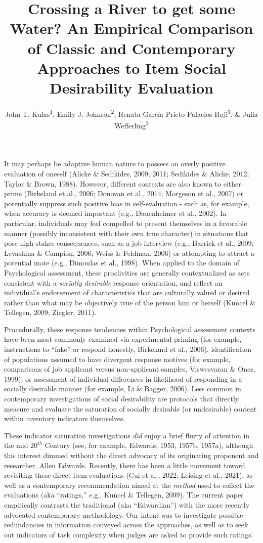 \documentclass[
  ,jou]{apa6}
\title{Crossing a River to get some Water? An Empirical Comparison of Classic and Contemporary Approaches to Item Social Desirability Evaluation}
\author{John T. Kulas\textsuperscript{1}, Emily J. Johnson\textsuperscript{2}, Renata García Prieto Palacios Roji\textsuperscript{3}, \& Julia Wefferling\textsuperscript{3}}
\date{}
\affiliation{\vspace{0.5cm}\textsuperscript{1} eRg\\\textsuperscript{2} St.~Cloud State University\\\textsuperscript{3} Montclair State University}
\begin{document}
\maketitle

It may perhaps be adaptive human nature to possess an overly positive evaluation of oneself (Alicke \& Sedikides, 2009, 2011; Sedikides \& Alicke, 2012; Taylor \& Brown, 1988). However, different contexts are also known to either prime (Birkeland et al., 2006; Donovan et al., 2014; Morgeson et al., 2007) or potentially suppress such positive bias in self-evaluation - such as, for example, when accuracy is deemed important (e.g., Dauenheimer et al., 2002). In particular, individuals may feel compelled to present themselves in a favorable manner (possibly inconsistent with their own true character) in situations that pose high-stakes consequences, such as a job interview (e.g., Barrick et al., 2009; Levashina \& Campion, 2006; Weiss \& Feldman, 2006) or attempting to attract a potential mate (e.g., Dimoulas et al., 1998). When applied to the domain of Psychological assessment, these proclivities are generally contextualized as acts consistent with a \emph{socially desirable} response orientation, and reflect an individual's endorsement of characteristics that are culturally valued or desired rather than what may be objectively true of the person him or herself (Kuncel \& Tellegen, 2009; Ziegler, 2011).

Procedurally, these response tendencies within Psychological assessment contexts have been most commonly examined via experimental priming (for example, instructions to ``fake'' or respond honestly, Birkeland et al., 2006), identification of populations assumed to have divergent response motives (for example, comparisons of job applicant versus non-applicant samples, Viswesvaran \& Ones, 1999), or assessment of individual differences in likelihood of responding in a socially desirable manner (for example, Li \& Bagger, 2006). Less common in contemporary investigations of social desirability are protocols that directly measure and evaluate the saturation of socially desirable (or undesirable) content within inventory indicators themselves.

These indicator saturation investigations \emph{did} enjoy a brief flurry of attention in the mid \(20^{th}\) Century (see, for example, Edwards, 1953, 1957b, 1957a), although this interest dimmed without the direct advocacy of its originating proponent and researcher, Allen Edwards. Recently, there has been a little movement toward revisiting these direct item evaluations (Cui et al., 2022; Leising et al., 2021), as well as a contemporary recommendation aimed at the \emph{method} used to collect the evaluations (aka ``ratings,'' e.g., Kuncel \& Tellegen, 2009). The current paper empirically contrasts the traditional (aka ``Edwardian'') with the more recently advocated contemporary methodology. Our intent was to investigate possible redundancies in information conveyed across the approaches, as well as to seek out indicators of task complexity when judges are asked to provide such ratings.
\end{document}
